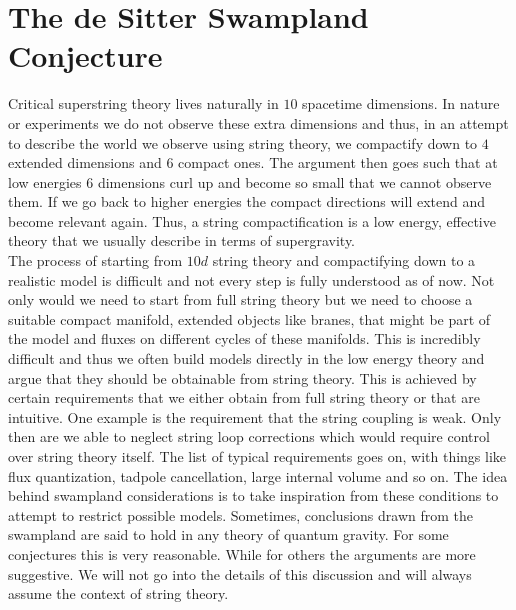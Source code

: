\documentclass[a4paper,12pt,twoside,openright]{report}
\begin{document}
\chapter{The de Sitter Swampland Conjecture}
\label{sec:swamplandconjectures}
Critical superstring theory lives naturally in $10$ spacetime dimensions. In nature or experiments we do not observe these extra dimensions and thus, in an attempt to describe the world we observe using string theory, we compactify down to $4$ extended dimensions and $6$ compact ones. The argument then goes such that at low energies $6$ dimensions curl up and become so small that we cannot observe them. If we go back to higher energies the compact directions will extend and become relevant again. Thus, a string compactification is a low energy, effective theory that we usually describe in terms of supergravity.\\
The process of starting from $10d$ string theory and compactifying down to a realistic model is difficult and not every step is fully understood as of now. Not only would we need to start from full string theory but we need to choose a suitable compact manifold, extended objects like branes, that might be part of the model and fluxes on different cycles of these manifolds. This is incredibly difficult and thus we often build models directly in the low energy theory and argue that they should be obtainable from string theory. This is achieved by certain requirements that we either obtain from full string theory or that are intuitive. One example is the requirement that the string coupling is weak. Only then are we able to neglect string loop corrections which would require control over string theory itself. The list of typical requirements goes on, with things like flux quantization, tadpole cancellation, large internal volume and so on. The idea behind swampland considerations is to take inspiration from these conditions to attempt to restrict possible models. Sometimes, conclusions drawn from the swampland are said to hold in any theory of quantum gravity. For some conjectures this is very reasonable. While for others the arguments are more suggestive. We will not go into the details of this discussion and will always assume the context of string theory.\\
\end{document}
